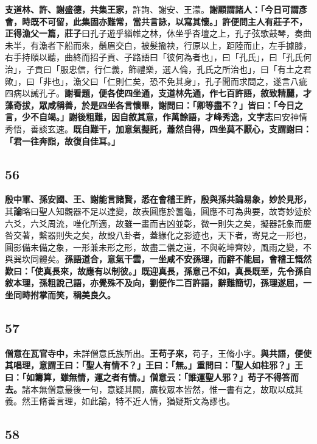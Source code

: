 \textbf{支道林、許、謝盛德，共集王家，}{\footnotesize 許詢、謝安、王濛。}\textbf{謝顧謂諸人：「今日可謂彥會，時既不可留，此集固亦難常，當共言詠，以寫其懷。」許便問主人有莊子不，正得漁父一篇，}{\footnotesize \textbf{莊子}曰孔子遊乎緇帷之林，休坐乎杏壇之上，孔子弦歌鼓琴，奏曲未半，有漁者下船而來，鬚眉交白，被髮揄袂，行原以上，距陸而止，左手據膝，右手持頤以聽，曲終而招子貢、子路語曰「彼何為者也」，曰「孔氏」，曰「孔氏何治」，子貢曰「服忠信，行仁義，飾禮樂，選人倫，孔氏之所治也」，曰「有土之君歟」，曰「非也」，漁父曰「仁則仁矣，恐不免其身」，孔子聞而求問之，遂言八疵四病以誡孔子。}\textbf{謝看題，便各使四坐通，支道林先通，作七百許語，敘致精麗，才藻奇拔，眾咸稱善，於是四坐各言懷畢，謝問曰：「卿等盡不？」皆曰：「今日之言，少不自竭。」謝後粗難，因自敘其意，作萬餘語，才峰秀逸，}{\footnotesize \textbf{文字志}曰安神情秀悟，善談玄速。}\textbf{既自難干，加意氣擬託，蕭然自得，四坐莫不厭心，支謂謝曰：「君一往奔詣，故復自佳耳。」}

\subsection*{56}

\textbf{殷中軍、孫安國、王、謝能言諸賢，悉在會稽王許，殷與孫共論易象，妙於見形，}{\footnotesize 其\textbf{論}略曰聖人知觀器不足以達變，故表圓應於蓍龜，圓應不可為典要，故寄妙迹於六爻，六爻周流，唯化所適，故雖一畫而吉凶並彰，微一則失之矣，擬器託象而慶咎交著，繫器則失之矣，故設八卦者，蓋緣化之影迹也，天下者，寄見之一形也，圓影備未備之象，一形兼未形之形，故盡二儀之道，不與乾坤齊妙，風雨之變，不與巽坎同體矣。}\textbf{孫語道合，意氣干雲，一坐咸不安孫理，而辭不能屈，會稽王慨然歎曰：「使真長來，故應有以制彼。」既迎真長，孫意己不如，真長既至，先令孫自敘本理，孫粗說己語，亦覺殊不及向，劉便作二百許語，辭難簡切，孫理遂屈，一坐同時拊掌而笑，稱美良久。}

\subsection*{57}

\textbf{僧意在瓦官寺中，}{\footnotesize 未詳僧意氏族所出。}\textbf{王苟子來，}{\footnotesize 苟子，王脩小字。}\textbf{與共語，便使其唱理，意謂王曰：「聖人有情不？」王曰：「無。」重問曰：「聖人如柱邪？」王曰：「如籌算，雖無情，運之者有情。」僧意云：「誰運聖人邪？」苟子不得答而去。}{\footnotesize 諸本無僧意最後一句，意疑其闕，廣校眾本皆然，惟一書有之，故取以成其義。然王脩善言理，如此論，特不近人情，猶疑斯文為謬也。}

\subsection*{58}

